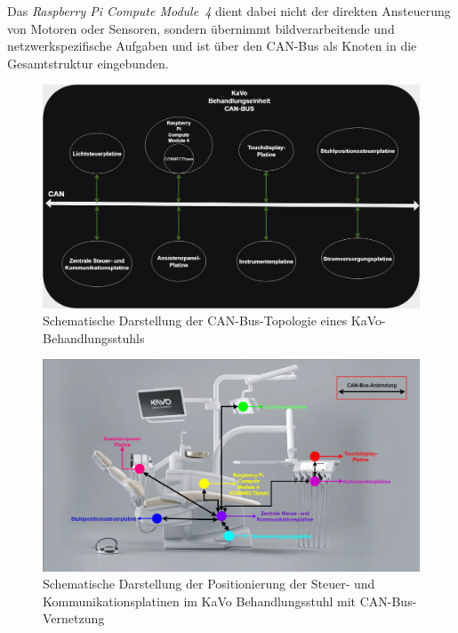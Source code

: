 Das \textit{Raspberry Pi Compute Module~4} dient dabei nicht der direkten Ansteuerung von Motoren oder Sensoren, sondern übernimmt bildverarbeitende und netzwerkspezifische Aufgaben und ist über den CAN-Bus als Knoten in die Gesamtstruktur eingebunden.

\vspace*{1cm}
\begin{figure}[H]
  \centering
  \begin{minipage}[b]{1.0\textwidth}
    \centering
    \includegraphics[width=\textwidth]{images/canbus4.drawio.png}
  \end{minipage}
  \hspace{0.05\textwidth}
  \caption{Schematische Darstellung der CAN-Bus-Topologie eines KaVo-Behandlungsstuhls}
  \label{fig:CAN-Bus-Topologie}
\end{figure}
\vspace{1em}

\vspace{1em}
\begin{figure}[H]
  \centering
  \begin{minipage}[b]{1.0\textwidth}
    \centering
    \includegraphics[width=\textwidth]{images/Unbenanntes Diagramm.drawio (4).drawio.png}
  \end{minipage}
  \hspace{0.05\textwidth}
  \caption{Schematische Darstellung der Positionierung der Steuer- und Kommunikationsplatinen im KaVo Behandlungsstuhl mit CAN-Bus-Vernetzung}
  \label{fig:Stuhl_Steuerplatinen_Topologie}
\end{figure}
\vspace{1em}

